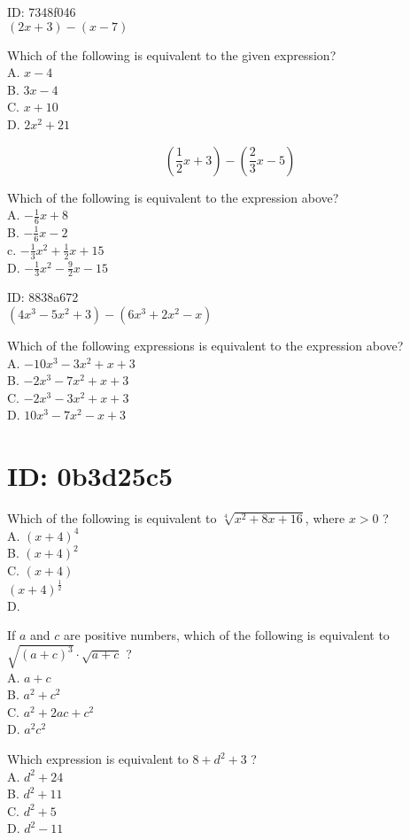 ID: 7348f046\\
$(2 x+3)-(x-7)$

Which of the following is equivalent to the given expression?\\
A. $x-4$\\
B. $3 x-4$\\
C. $x+10$\\
D. $2 x^{2}+21$

$$
\left(\frac{1}{2} x+3\right)-\left(\frac{2}{3} x-5\right)
$$

Which of the following is equivalent to the expression above?\\
A. $-\frac{1}{6} x+8$\\
B. $-\frac{1}{6} x-2$\\
c. $-\frac{1}{3} x^{2}+\frac{1}{2} x+15$\\
D. $-\frac{1}{3} x^{2}-\frac{9}{2} x-15$

ID: 8838a672\\
$\left(4 x^{3}-5 x^{2}+3\right)-\left(6 x^{3}+2 x^{2}-x\right)$

Which of the following expressions is equivalent to the expression above?\\
A. $-10 x^{3}-3 x^{2}+x+3$\\
B. $-2 x^{3}-7 x^{2}+x+3$\\
C. $-2 x^{3}-3 x^{2}+x+3$\\
D. $10 x^{3}-7 x^{2}-x+3$

\section*{ID: 0b3d25c5}
Which of the following is equivalent to $\sqrt[4]{x^{2}+8 x+16}$, where $x>0$ ?\\
A. $(x+4)^{4}$\\
B. $(x+4)^{2}$\\
C. $(x+4)$\\
$(x+4)^{\frac{1}{2}}$\\
D.

If $a$ and $c$ are positive numbers, which of the following is equivalent to $\sqrt{(a+c)^{3}} \cdot \sqrt{a+c}$ ?\\
A. $a+c$\\
B. $a^{2}+c^{2}$\\
C. $a^{2}+2 a c+c^{2}$\\
D. $a^{2} c^{2}$

Which expression is equivalent to $8+d^{2}+3$ ?\\
A. $d^{2}+24$\\
B. $d^{2}+11$\\
C. $d^{2}+5$\\
D. $d^{2}-11$


